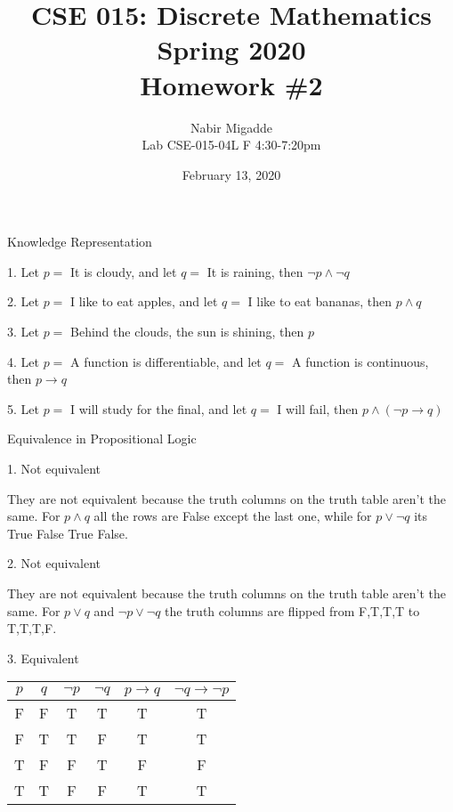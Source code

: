 \documentclass[11pt]{article}
\begin{document}
\author{Nabir Migadde\\
Lab CSE-015-04L F 4:30-7:20pm}

\title{CSE 015: Discrete Mathematics\\
Spring 2020\\
Homework \#2\\}

\date{February 13, 2020}
\maketitle

Knowledge Representation

1. Let $p =$ It is cloudy, and let $q =$ It is raining, then $\lnot p \land \lnot q$

2. Let $p =$ I like to eat apples, and let $q =$ I like to eat bananas, then $p \land q$

3. Let $p =$ Behind the clouds, the sun is shining, then $p$

4. Let $p =$ A function is differentiable, and let $q =$ A function is continuous, then $p \rightarrow q$

5. Let $p =$ I will study for the final, and let $q =$ I will fail, then $p \land (\lnot p \rightarrow q)$

Equivalence in Propositional Logic

1. Not equivalent

They are not equivalent because the truth columns on the truth table aren't the same. For $p \land q$ all the rows are False except the last one, while for $p \lor \lnot q$ its True False True False. 

2. Not equivalent

They are not equivalent because the truth columns on the truth table aren't the same. For $p \lor q$ and $\lnot p \lor \lnot q$ the truth columns are flipped from F,T,T,T to T,T,T,F.

3. Equivalent
\begin{center}
\begin{tabular}{|c|c|c|c|c|c|}
\hline
$p$ & $q$ & $\lnot p$ & $\lnot q$ & $p \rightarrow q$ & $\lnot q \rightarrow \lnot p$\\
\hline
F & F & T & T & T & T\\
F & T & T & F & T & T\\
T & F & F & T & F & F\\
T & T & F & F & T & T\\
\hline
\end{tabular}
\end{center}
\end{document}
